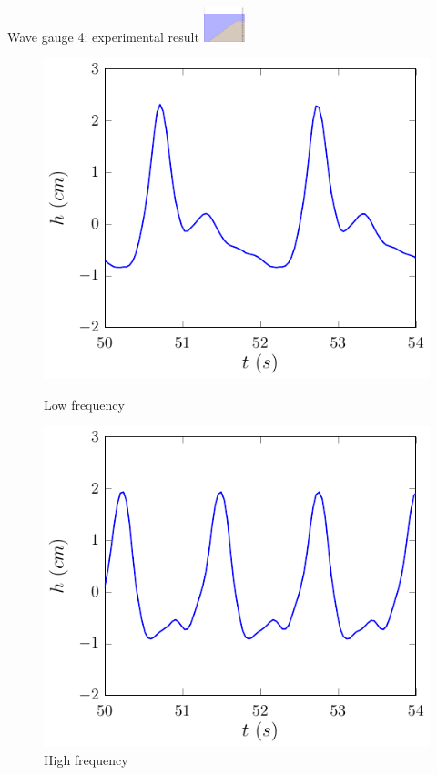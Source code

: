 \documentclass[pdf]{beamer}
\begin{document}
\begin{frame}{Wave gauge 4: experimental result \space\space	\includegraphics[width=1.2cm]{./Pics/WT4z.pdf}  }
	\begin{figure}
		\centering
		\begin{minipage}{.5\textwidth}
			\centering
			\includegraphics[width=0.9\linewidth]{./Pics/SL/WG4/1e-figure0.pdf}
			\caption{Low frequency}
		\end{minipage}%
		\begin{minipage}{.5\textwidth}
			\centering
			\includegraphics[width=0.9\linewidth]{./Pics/SH/WG4/1e-figure0.pdf}
			\caption{High frequency}
		\end{minipage}
	\end{figure}
\end{frame}
\end{document}
